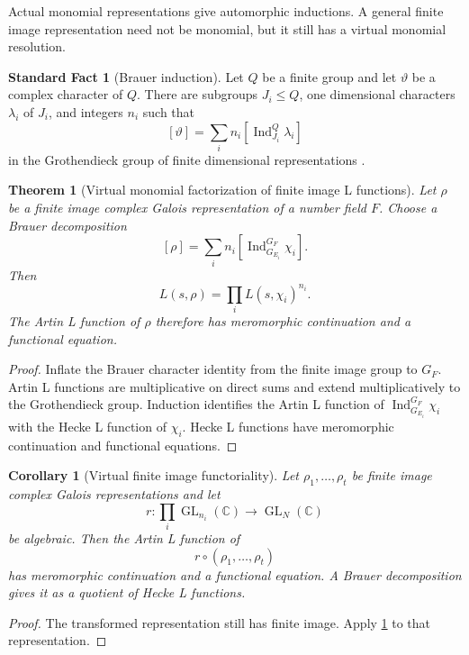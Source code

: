 \documentclass{aomart}
\newtheorem{theorem}{Theorem}[section]
\newtheorem{corollary}[corollary]{Corollary}
\theoremstyle{definition}
\newtheorem{standardfact}[standardfact]{Standard Fact}
\theoremstyle{remark}
\newcommand{\CC}{\mathbb C}
\newcommand{\GL}{\operatorname{GL}}
\newcommand{\Ind}{\operatorname{Ind}}
\begin{document}
Actual monomial representations give automorphic inductions. A general finite image representation need not be monomial, but it still has a virtual monomial resolution.

\begin{standardfact}[Brauer induction]\label{fact:brauer_induction}
Let \(Q\) be a finite group and let \(\vartheta\) be a complex character of \(Q\). There are subgroups \(J_i\leq Q\), one dimensional characters \(\lambda_i\) of \(J_i\), and integers \(n_i\) such that
\[
\boxed{
[\vartheta]
=
\sum_i n_i
\left[
\Ind_{J_i}^Q\lambda_i
\right]
}
\]
in the Grothendieck group of finite dimensional representations \cite{Brauer1947,Serre1977}.
\end{standardfact}

\begin{theorem}[Virtual monomial factorization of finite image L functions]\label{thm:brauer_L_factorization}
Let \(\rho\) be a finite image complex Galois representation of a number field \(F\). Choose a Brauer decomposition
\[
[\rho]
=
\sum_i n_i
\left[
\Ind_{G_{E_i}}^{G_F}\chi_i
\right].
\]
Then
\[
\boxed{
L(s,\rho)
=
\prod_i
L(s,\chi_i)^{n_i}.
}
\]
The Artin L function of \(\rho\) therefore has meromorphic continuation and a functional equation.
\end{theorem}

\begin{proof}
Inflate the Brauer character identity from the finite image group to \(G_F\). Artin L functions are multiplicative on direct sums and extend multiplicatively to the Grothendieck group. Induction identifies the Artin L function of \(\Ind_{G_{E_i}}^{G_F}\chi_i\) with the Hecke L function of \(\chi_i\). Hecke L functions have meromorphic continuation and functional equations.
\end{proof}

\begin{corollary}[Virtual finite image functoriality]\label{cor:brauer_functoriality}
Let \(\rho_1,\ldots,\rho_t\) be finite image complex Galois representations and let
\[
r:\prod_i\GL_{n_i}(\CC)\longrightarrow\GL_N(\CC)
\]
be algebraic. Then the Artin L function of
\[
r\circ(\rho_1,\ldots,\rho_t)
\]
has meromorphic continuation and a functional equation. A Brauer decomposition gives it as a quotient of Hecke L functions.
\end{corollary}

\begin{proof}
The transformed representation still has finite image. Apply \cref{thm:brauer_L_factorization} to that representation.
\end{proof}
\end{document}

